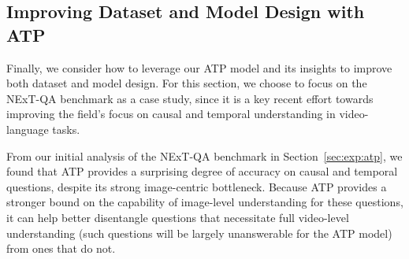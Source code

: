 \begin{table}[t]

\centering
\setlength\tabcolsep{0.1pt}
\caption{\textbf{Video-language (text-to-video) retrieval.} We show that our ATP analysis technique generalizes beyond video question answering settings. ( indicates zero-shot reported by prior work; see supplement for a more complete prior work comparisons table.)}
\label{tbl:vid-lang:all}
\end{table}

\subsection{Improving Dataset and Model Design with ATP}
\label{sec:exp:next-qa}

Finally, we consider how to leverage our ATP model and its insights to improve both dataset and model design. For this section, we choose to focus on the NExT-QA benchmark \cite{xiao2021next} as a case study, since it is a key recent effort towards improving the field's focus on causal and temporal understanding in video-language tasks.

 From our initial analysis of the NExT-QA benchmark in Section~\ref{sec:exp:atp}, we found that ATP provides a surprising degree of accuracy on causal and temporal questions, despite its strong image-centric bottleneck. Because ATP provides a stronger bound on the capability of image-level understanding for these questions, it can help better disentangle questions that necessitate full video-level understanding (such questions will be largely unanswerable for the ATP model) from ones that do not. 

